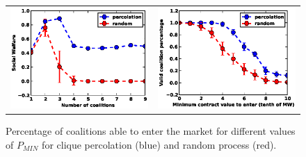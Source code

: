 \documentclass[conference]{IEEEtran}
\begin{document}
\begin{center}
\begin{figure}
\setlength{\tabcolsep}{0em}
\begin{tabular}{cc}
   \includegraphics[scale=0.45]{./figure7/uti.eps} &
   \includegraphics[scale=0.45]{./figure4/survival.eps} \\
\end{tabular}
   \caption{Percentage of coalitions able to enter the market for different values of $ P_{MIN} $ for clique percolation (blue) and random process (red).}
   \label{Fig4}
\end{figure}
\end{center}
\end{document}
